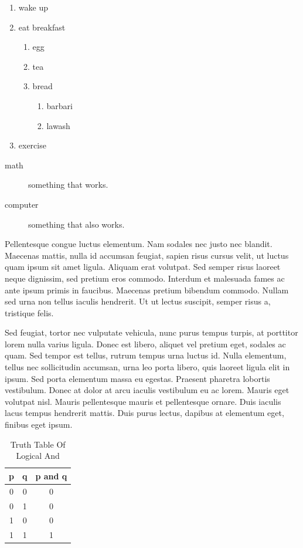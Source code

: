 \documentclass[a4paper, 12pt]{article}
\begin{document}
	\begin{enumerate}
		\item wake up
		\item eat breakfast
		\begin{enumerate}
			\item egg
			\item tea
			\item bread
			\begin{enumerate}
				\item barbari
				\item lawash
			\end{enumerate}
		\end{enumerate}
		\item exercise
	\end{enumerate}

	\begin{description}
		\item[math] something that works.
		\item[computer] something that also works.
	\end{description}
	
	Pellentesque congue luctus elementum. Nam sodales nec justo nec blandit. Maecenas mattis, nulla id accumsan feugiat, sapien risus cursus velit, ut luctus quam ipsum sit amet ligula. Aliquam erat volutpat. Sed semper risus laoreet neque dignissim, sed pretium eros commodo. Interdum et malesuada fames ac ante ipsum primis in faucibus. Maecenas pretium bibendum commodo. Nullam sed urna non tellus iaculis hendrerit. Ut ut lectus suscipit, semper risus a, tristique felis.
	
	Sed feugiat, tortor nec vulputate vehicula, nunc purus tempus turpis, at porttitor lorem nulla varius ligula. Donec est libero, aliquet vel pretium eget, sodales ac quam. Sed tempor est tellus, rutrum tempus urna luctus id. Nulla elementum, tellus nec sollicitudin accumsan, urna leo porta libero, quis laoreet ligula elit in ipsum. Sed porta elementum massa eu egestas. Praesent pharetra lobortis vestibulum. Donec at dolor at arcu iaculis vestibulum eu ac lorem. Mauris eget volutpat nisl. Mauris pellentesque mauris et pellentesque ornare. Duis iaculis lacus tempus hendrerit mattis. Duis purus lectus, dapibus at elementum eget, finibus eget ipsum.
	
	\begin{table}[h!]
		\centering
		\begin{tabular}{|cc|c|}
			\hline
			p & q & p and q\\\hline
			0 & 0 & 0\\
			0 & 1 & 0\\
			1 & 0 & 0\\
			1 & 1 & 1\\\hline
		\end{tabular}
		\caption{Truth Table Of Logical And}
	\end{table}
	
\end{document}
